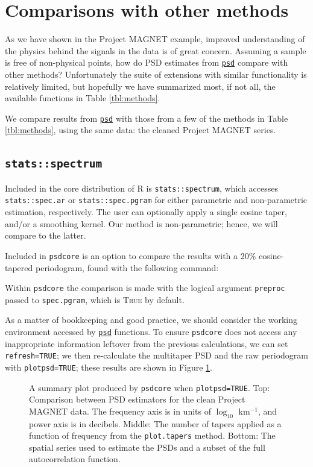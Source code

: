 \documentclass[10pt]{article}\usepackage[]{graphicx}\usepackage[]{color}
\newcommand{\SC}[1]{\textsc{#1}}
\newcommand{\Rcmd}[1]{\texttt{#1}}
\newcommand{\psd}[0]{\href{http://www.github.com/abarbour/psd/}{\color{blue}\Rcmd{psd}}}
\begin{document}
\clearpage

\section{Comparisons with other methods}

As we have shown in the Project MAGNET example, 
improved understanding of the physics behind the signals in the data
is of great concern.
Assuming a sample is free of non-physical points, how do
PSD estimates from \psd{} compare with other methods?
Unfortunately the suite of extensions with similar functionality
is relatively limited, but hopefully we have
summarized most, if not all, the available functions in Table \ref{tbl:methods}.



We compare results from
\psd{} with those from a few of the methods in Table \ref{tbl:methods},
using the same data: the cleaned Project MAGNET series.

\subsection{\Rcmd{stats::spectrum}}

Included in the core distribution of R is \Rcmd{stats::spectrum}, which
accesses \Rcmd{stats::spec.ar} or \Rcmd{stats::spec.pgram} for either
parametric and non-parametric estimation, respectively.  
The user can optionally apply a single cosine taper, and/or a smoothing kernel.
Our method is non-parametric; hence, we will compare to the latter.

Included in \Rcmd{psdcore} is an option to compare the 
results with a 20\% cosine-tapered periodogram,
found with the following command:

Within \Rcmd{psdcore} the comparison is made with the logical argument \Rcmd{preproc} 
passed to \Rcmd{spec.pgram}, which is \SC{True} by default.

As a matter of bookkeeping and good practice, we should consider the working environment
accessed by \psd{} functions. 
To ensure \Rcmd{psdcore} does not access any inappropriate information leftover
from the previous calculations, we can set \Rcmd{refresh=TRUE}; we then 
re-calculate the multitaper PSD and the raw periodogram with \Rcmd{plotpsd=TRUE}; these
results are shown in Figure \ref{fig:two}.

\begin{figure}[!htbp]
\begin{center}

\caption{A summary plot produced by \Rcmd{psdcore} when
\Rcmd{plotpsd=TRUE}.  
Top: Comparison between PSD estimators for the 
clean Project MAGNET data. The frequency axis is in units of $\log_{10}$ km$^{-1}$,
and power axis is in decibels.
Middle: The number of tapers applied as a function of frequency from
the \Rcmd{plot.tapers} method. 
Bottom: The spatial series used to estimate the PSDs and a subset
of the full autocorrelation function.}
\label{fig:two}
\end{center}
\end{figure}
\end{document}
